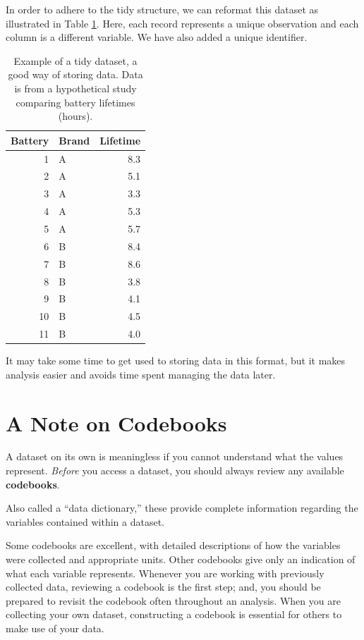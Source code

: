 \documentclass[]{book}
\theoremstyle{plain}
\theoremstyle{mydefn}
\theoremstyle{myexmpl}
\theoremstyle{remark}
\let\BeginKnitrBlock\begin \let\EndKnitrBlock\end
\let\BeginKnitrBlock\begin \let\EndKnitrBlock\end
\begin{document}
In order to adhere to the tidy structure, we can reformat this dataset
as illustrated in Table \ref{tab:basics-good-dataset}. Here, each record
represents a unique observation and each column is a different variable.
We have also added a unique identifier.

\begin{table}

\caption{\label{tab:basics-good-dataset}Example of a tidy dataset, a good way of storing data.  Data is from a hypothetical study comparing battery lifetimes (hours).}
\centering
\begin{tabular}[t]{r|l|r}
\hline
Battery & Brand & Lifetime\\
\hline
1 & A & 8.3\\
\hline
2 & A & 5.1\\
\hline
3 & A & 3.3\\
\hline
4 & A & 5.3\\
\hline
5 & A & 5.7\\
\hline
6 & B & 8.4\\
\hline
7 & B & 8.6\\
\hline
8 & B & 3.8\\
\hline
9 & B & 4.1\\
\hline
10 & B & 4.5\\
\hline
11 & B & 4.0\\
\hline
\end{tabular}
\end{table}

It may take some time to get used to storing data in this format, but it
makes analysis easier and avoids time spent managing the data later.

\section{A Note on Codebooks}\label{a-note-on-codebooks}

A dataset on its own is meaningless if you cannot understand what the
values represent. \emph{Before} you access a dataset, you should always
review any available \textbf{codebooks}.

\BeginKnitrBlock{definition}[Codebook]
\protect\hypertarget{def:defn-codebook}{}{\label{def:defn-codebook}
{} }Also called a ``data dictionary,'' these
provide complete information regarding the variables contained within a
dataset.
\EndKnitrBlock{definition}

Some codebooks are excellent, with detailed descriptions of how the
variables were collected and appropriate units. Other codebooks give
only an indication of what each variable represents. Whenever you are
working with previously collected data, reviewing a codebook is the
first step; and, you should be prepared to revisit the codebook often
throughout an analysis. When you are collecting your own dataset,
constructing a codebook is essential for others to make use of your
data.
\end{document}
